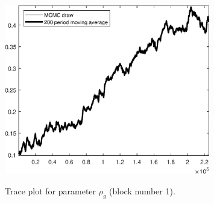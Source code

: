 \begin{figure}[H]
\centering
  \includegraphics[width=0.8\textwidth]{BRS_sectoral/graphs/TracePlot_rho_g_blck_1}\\
    \caption{Trace plot for parameter ${\rho_g}$ (block number 1).}
\end{figure}
